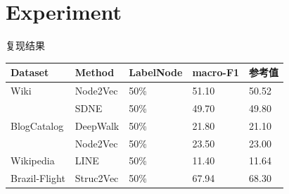 \documentclass{beamer}
\begin{document}
\section{Experiment}
\begin{frame}{复现结果}
    \begin{table}[]
        \begin{tabular}{|l|l|l|l|l|}
        \hline
        Dataset       & Method    & LabelNode & macro-F1 & 参考值 \\ \hline
        Wiki          & Node2Vec  & 50\%      & 51.10    & 50.52  \\ \hline
                      & SDNE      & 50\%      & 49.70    & 49.80  \\ \hline
        BlogCatalog   & DeepWalk  & 50\%      & 21.80    & 21.10  \\ \hline
                      & Node2Vec  & 50\%      & 23.50    & 23.00  \\ \hline
        Wikipedia     & LINE      & 50\%      & 11.40    & 11.64  \\ \hline
        Brazil-Flight & Struc2Vec & 50\%      & 67.94    & 68.30  \\ \hline
        \end{tabular}
    \end{table}
\end{frame}
\end{document}
